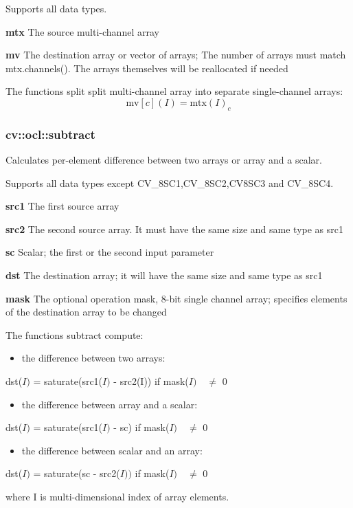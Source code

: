\documentclass{article}
\begin{document}
Supports all data types.

\textbf{mtx }The source multi-channel array

\textbf{mv }The destination array or vector of arrays; The number of arrays
must match mtx.channels(). The arrays themselves will be reallocated if
needed

The functions split split multi-channel array into separate single-channel
arrays:
\[
\mbox{mv}\left[ c \right](I)=\mbox{mtx}(I)_c
\]
\newpage

\subsubsection{cv::ocl::subtract}
\label{subsubsec:mylabel28}
Calculates per-element difference between two arrays or array and a scalar.

Supports all data types except CV{\_}8SC1,CV{\_}8SC2,CV8SC3 and CV{\_}8SC4.

\textbf{src1 }The first source array

\textbf{src2 }The second source array. It must have the same size and same
type as src1

\textbf{sc }Scalar; the first or the second input parameter

\textbf{dst }The destination array; it will have the same size and same type
as src1

\textbf{mask }The optional operation mask, 8-bit single channel array;
specifies elements of the destination array to be changed

The functions subtract compute:

\begin{itemize}
\item the difference between two arrays:
\end{itemize}
dst($I)$ = saturate(src1($I)$ - src2(I)) if mask($I) \quad \ne $ 0

\begin{itemize}
\item the difference between array and a scalar:
\end{itemize}
dst($I)$ = saturate(src1($I)$ - sc) if mask($I) \quad \ne $ 0

\begin{itemize}
\item the difference between scalar and an array:
\end{itemize}
dst($I)$ = saturate(sc - src2($I))$ if mask($I) \quad \ne $ 0

where I is multi-dimensional index of array elements.
\end{document}
